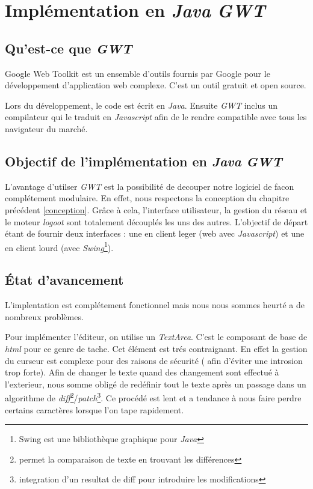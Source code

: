 \section{Implémentation en \emph{Java} \emph{GWT}}
  \subsection{Qu'est-ce que \emph{GWT}}
  Google Web Toolkit est un ensemble d'outils fournis par Google pour le
   développement d'application web complexe. C'est un outil gratuit et 
   open source.
   
   Lors du développement, le code est écrit en  \emph{Java}. Ensuite \emph{GWT} inclus un 
   compilateur qui le traduit en \emph{Javascript} afin de le rendre compatible
   avec tous les navigateur du marché.
   
  \subsection{Objectif de l'implémentation en \emph{Java} \emph{GWT}}
  L'avantage d'utilser \emph{GWT} est la possibilité de decouper notre 
  logiciel de facon complétement modulaire. En effet, nous respectons la
  conception du chapitre précédent \ref{conception}. Grâce à cela, 
  l'interface utilisateur, la gestion du réseau et le moteur \emph{logoot}
  sont totalement découplés les uns des autres. L'objectif de départ étant
  de fournir deux interfaces : une en client leger (web avec \emph{Javascript})
  et une en client lourd (avec \emph{Swing}\footnote{Swing est une bibliothèque
  graphique pour \emph{Java}}). 
  
  \subsection{État d'avancement}
	L'implentation est complétement fonctionnel mais nous nous sommes heurté
	a de nombreux problèmes.
	
	\label{sec:textarea}
	Pour implémenter l'éditeur, on utilise un \emph{TextArea}. C'est le 
	composant de base de \emph{html} pour ce genre de tache. Cet élément 
	est trés contraignant. En effet la gestion du curseur est complexe
	pour des raisons de sécurité ( afin d'éviter une introsion trop forte).
	Afin de changer le texte quand des changement sont effectué à 
	l'exterieur, nous somme obligé de redéfinir tout le texte après un 
	passage dans un algorithme de \emph{diff}\footnote{permet la comparaison 
	de texte en trouvant les différences}/\emph{patch}\footnote{integration
	d'un resultat de diff pour introduire les modifications}. Ce procédé
	est lent et a tendance à nous faire perdre certains caractères lorsque
	l'on tape rapidement.
	
